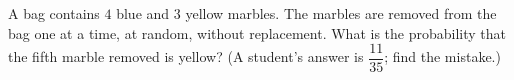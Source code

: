 A bag contains $4$ blue and $3$ yellow marbles. The marbles are removed from the bag one at a time, at random, without replacement. What is the probability that the fifth marble removed is yellow? (A student's answer is $\dfrac{11}{35}$; find the mistake.)
